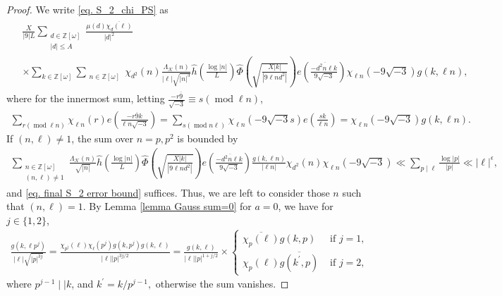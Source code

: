 \documentclass[11pt]{amsart}
\numberwithin{equation}{section}
\newcommand{\mymod}[1]{(\operatorname{mod} #1)}
\theoremstyle{remark}
\begin{document}
\begin{proof}
We write \eqref{eq. S_2_chi_PS}  as
\begin{align}\label{eq. S_2_chi_error1}
 \begin{split}
    &\frac{X}{|9|L}
    \sum_{\substack{d\in \mathbb{Z}[\omega]\\ |d|\le A}}\frac{\mu(d)\overline{\chi_d(\ell)}}{|d|^2} \\
    &\times
    \sum_{k\in\mathbb{Z}[\omega]}
    \sum_{\substack{n\in \mathbb{Z}[\omega]}}\chi_{d^2}( n)\frac{\Lambda_\mathcal{K}(n)}{|\ell|\sqrt{|n|^3}}
	\hat{h}\left(\frac{\log |n|}{L}\right)
	\widehat{\Phi}\left(\sqrt{\frac{X|k|}{|9{\ell n}d^2|}}\right)
    e\left(\frac{-\overline{d^2n\ell}k}{9\sqrt{-3}}\right)
    \chi_{\ell n }(-9\sqrt{-3})g(k, \ell n),
    \end{split}
\end{align}
where for the innermost sum, letting $\frac{-r\overline{9}}{\sqrt{-3}}\equiv s\mymod{\ell n}$,
\begin{align}
    \sum_{r\mymod {\ell n}} \chi_{\ell n}(r) 
    e\left(\frac{-r\overline{9}k}{{\ell n}\sqrt{-3}}\right)
    =
    \sum_{s\mymod{n\ell}}\chi_{\ell n}(-9\sqrt{-3}s)e\left(\frac{sk}{\ell n}\right) 
    =\chi_{\ell n }(-9\sqrt{-3})g(k, \ell n).
    \end{align}
If $(n, \ell)\ne 1$, the sum over $n=p, p^2$ is bounded by
\begin{align*}
    \sum_{\substack{n\in \mathbb{Z}[\omega]\\(n, \ell)\ne 1}}\frac{\Lambda_\mathcal{K}(n)}{\sqrt{|n|}}
	\hat{h}\left(\frac{\log |n|}{L}\right)
	\widehat{\Phi}\left(\sqrt{\frac{X|k|}{|9{\ell n}d^2|}}\right)
    e\left(\frac{-\overline{d^2n\ell}k}{9\sqrt{-3}}\right)
    \frac{g(k, \ell n)}{|\ell n|}\chi_{d^2}( n)\chi_{\ell n }(-9\sqrt{-3})
   \ll
    \sum_{p\mid \ell}\frac{\log |p|}{|p|}
    \ll
    |\ell|^\epsilon,
\end{align*}
and \eqref{eq. final S_2 error bound} suffices.
Thus, we are left to consider those $n$ such that $(n, \ell)=1.$ 
By Lemma \ref{lemma Gauss sum=0} for $a=0$, we have for $j\in \{1, 2\}$,
\begin{align}
\label{eq. Gauss sum splits}
    \frac{g(k, \ell p^j)}{|\ell|\sqrt{|p|^{3j}}}
    =
    \frac{\chi_{p^{j}}(\ell)\chi_{\ell}(p^{j})g(k, p^{j})g(k, \ell)}{|\ell||p|^{3j/2}}
    =
    \frac{g(k, \ell)}{|\ell||p|^{1+j/2}}
    \times
    \begin{cases}
        \overline{\chi_p(\ell)}g(k, p)   &\text{ if }    j=1,\\
        \chi_p(\ell)\overline{g\left(k^\prime, p\right)}   &\text{ if }    j=2,
    \end{cases}
\end{align}
where $p^{j-1} \mid \mid k$, and $k^\prime=k/p^{j-1},$ otherwise the sum vanishes. 



\end{proof}
\end{document}
